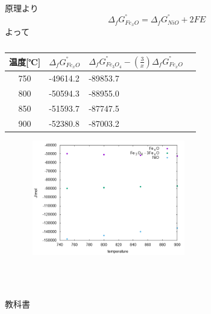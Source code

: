 \documentclass{jsarticle}
\begin{document}
\subsection{}
原理より
$$
\Delta_{f}G_{Fe_xO}^{°}=\Delta_{f}G_{NiO}^{°}+2FE
$$
よって
\begin{table}[h]
\caption{}
 \label{table:SpeedOfLight}
 \centering
  \begin{tabular}{clll}
   \hline
   温度[℃] & $\Delta_{f}G_{Fe_xO}^{°}$ & $\Delta_{f}G_{Fe_3O_4}^{°} - (\frac{3}{x})\Delta_{f}G_{Fe_xO}^{°}$\\
   \hline \hline
   750 & -49614.2 & -89853.7\\
   800 & -50594.3 & -88955.0\\
   850 & -51593.7 & -87747.5\\
   900 & -52380.8 & -87003.2\\
   \hline
  \end{tabular}
\end{table}
\begin{figure}[htbp]
 \begin{center}
  \includegraphics[width=70mm,height=50mm]{pictures/4-3.png}
 \end{center}
 \caption{}
 \label{fig:one}
\end{figure}
\\
\\
\begin{thebibliography}{99}
\bibitem{}  教科書
\end{thebibliography} 
\end{document}

